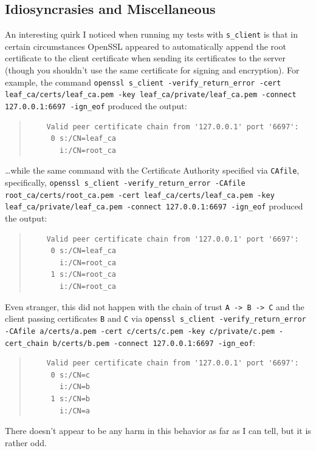 \documentclass{article}
\begin{document}
\subsection{Idiosyncrasies and Miscellaneous}
An interesting quirk I noticed when running my tests with \texttt{s_client} is that in certain circumstances OpenSSL appeared to automatically append the root certificate to the client certificate when sending its certificates to the server (though you shouldn't use the same certificate for signing and encryption).  For example, the command \texttt{openssl s_client -verify_return_error -cert leaf_ca/certs/leaf_ca.pem -key leaf_ca/private/leaf_ca.pem -connect 127.0.0.1:6697 -ign_eof} produced the output:

\begin{quote}
\begin{verbatim}
	Valid peer certificate chain from '127.0.0.1' port '6697':
	 0 s:/CN=leaf_ca
	   i:/CN=root_ca
\end{verbatim}
\end{quote}

\ldots while the same command with the Certificate Authority specified via \texttt{CAfile}, specifically, \texttt{openssl s_client -verify_return_error -CAfile root_ca/certs/root_ca.pem -cert leaf_ca/certs/leaf_ca.pem -key leaf_ca/private/leaf_ca.pem -connect 127.0.0.1:6697 -ign_eof} produced the output:

\begin{quote}
\begin{verbatim}
	Valid peer certificate chain from '127.0.0.1' port '6697':
	 0 s:/CN=leaf_ca
	   i:/CN=root_ca
	 1 s:/CN=root_ca
	   i:/CN=root_ca
\end{verbatim}
\end{quote}

Even stranger, this did not happen with the chain of trust \texttt{A -> B -> C} and the client passing certificates \texttt{B} and \texttt{C} via \texttt{openssl s_client -verify_return_error -CAfile a/certs/a.pem -cert c/certs/c.pem -key c/private/c.pem -cert_chain b/certs/b.pem -connect 127.0.0.1:6697 -ign_eof}:

\begin{quote}
\begin{verbatim}
	Valid peer certificate chain from '127.0.0.1' port '6697':
	 0 s:/CN=c
	   i:/CN=b
	 1 s:/CN=b
	   i:/CN=a
\end{verbatim}
\end{quote}

There doesn't appear to be any harm in this behavior as far as I can tell, but it is rather odd.
\end{document}
